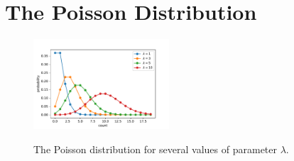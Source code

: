 \documentclass[12pt,oneside]{book}
\begin{document}
\section{The Poisson Distribution}

\begin{figure}[htbp]
\begin{center}
{\includegraphics[width=0.45\textwidth]{figs/poisson.pdf}}
\end{center}
\caption{\label{fig:poisson}  The Poisson distribution for several values of parameter $\lambda$.}
\end{figure}
\end{document}
